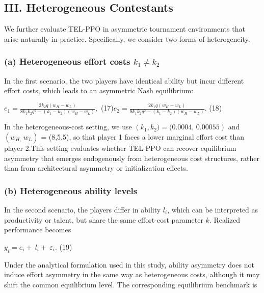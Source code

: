 \documentclass[
]{article}
\begin{document}
\subsection{\texorpdfstring{\textbf{III. Heterogeneous
Contestants}}{III. Heterogeneous Contestants}}\label{iii.-heterogeneous-contestants}

We further evaluate TEL-PPO in asymmetric tournament environments that
arise naturally in practice. Specifically, we consider two forms of
heterogeneity.

\subsubsection{\texorpdfstring{\textbf{(a) Heterogeneous effort costs}
\(k_{1} \neq k_{2}\)}{(a) Heterogeneous effort costs k\_\{1\} \textbackslash neq k\_\{2\}}}\label{a-heterogeneous-effort-costs-k_1-neq-k_2}

In the first scenario, the two players have identical ability but incur
different effort costs, which leads to an asymmetric Nash equilibrium:

\(e_{1} = \frac{2k_{2}q(w_{H} - w_{L})}{8k_{1}k_{2}q^{2} - (k_{1} - k_{2})(w_{H} - w_{L})},\)
(17)\(
e_{2} = \frac{2k_{1}q(w_{H} - w_{L})}{8k_{1}k_{2}q^{2} - (k_{1} - k_{2})(w_{H} - w_{L})}.\)
(18)

In the heterogeneous-cost setting, we use
\(\left( k_{1},k_{2}) = (0.0004\text{, 0.00055} \right)\) and
\((w_{H,\ }w_{L})\) = (8,5.5), so that player 1 faces a lower marginal
effort cost than player 2.This setting evaluates whether TEL-PPO can
recover equilibrium asymmetry that emerges endogenously from
heterogeneous cost structures, rather than from architectural asymmetry
or initialization effects.

\subsubsection{\texorpdfstring{\textbf{(b) Heterogeneous ability
levels}}{(b) Heterogeneous ability levels}}\label{b-heterogeneous-ability-levels}

In the second scenario, the players differ in ability \(l_{i}\), which
can be interpreted as productivity or talent, but share the same
effort-cost parameter \(k\). Realized performance becomes

\(y_{i} = e_{i} + \ l_{i} + \ \varepsilon_{i}\). (19)

Under the analytical formulation used in this study, ability asymmetry
does not induce effort asymmetry in the same way as heterogeneous costs,
although it may shift the common equilibrium level. The corresponding
equilibrium benchmark is
\end{document}
